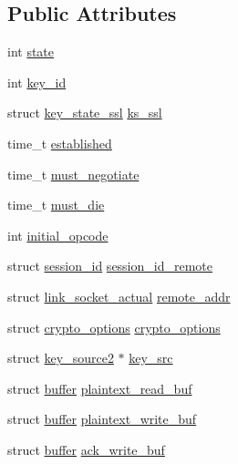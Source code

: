 \subsection*{Public Attributes}
\begin{DoxyCompactItemize}
\item 
int \hyperlink{structkey__state_a42be32cf0cb8d287f43befbbb6715472}{state}
\item 
int \hyperlink{structkey__state_ab96385bedbe98845a4b5c64adb4e9f09}{key\+\_\+id}
\item 
struct \hyperlink{structkey__state__ssl}{key\+\_\+state\+\_\+ssl} \hyperlink{structkey__state_a8fe04c96cfdb018c1e0076355b866b39}{ks\+\_\+ssl}
\item 
time\+\_\+t \hyperlink{structkey__state_a7b4fcfc00225857f9d9dbd8cf8b0a213}{established}
\item 
time\+\_\+t \hyperlink{structkey__state_a9ab42fd298323e60f3970178fb127330}{must\+\_\+negotiate}
\item 
time\+\_\+t \hyperlink{structkey__state_a4dcda328566d402e1b0413df355398d6}{must\+\_\+die}
\item 
int \hyperlink{structkey__state_af0e663142818e5e45c4fd6b434c8c431}{initial\+\_\+opcode}
\item 
struct \hyperlink{structsession__id}{session\+\_\+id} \hyperlink{structkey__state_aa2f4046c0cb3757c8cc20702dc4097ad}{session\+\_\+id\+\_\+remote}
\item 
struct \hyperlink{structlink__socket__actual}{link\+\_\+socket\+\_\+actual} \hyperlink{structkey__state_a62d42581c267f57f88b125c70fc98439}{remote\+\_\+addr}
\item 
struct \hyperlink{structcrypto__options}{crypto\+\_\+options} \hyperlink{structkey__state_a2432af1bf9969f63599688a7adf3306d}{crypto\+\_\+options}
\item 
struct \hyperlink{structkey__source2}{key\+\_\+source2} $\ast$ \hyperlink{structkey__state_af59a9aa0960261d4ed9d816b5448b732}{key\+\_\+src}
\item 
struct \hyperlink{structbuffer}{buffer} \hyperlink{structkey__state_a367442f94779a58b94e7d0f3c5d56c20}{plaintext\+\_\+read\+\_\+buf}
\item 
struct \hyperlink{structbuffer}{buffer} \hyperlink{structkey__state_a5c5ca3ca552b1cc3718d81587bdeb9c9}{plaintext\+\_\+write\+\_\+buf}
\item 
struct \hyperlink{structbuffer}{buffer} \hyperlink{structkey__state_a2fbf1804a3fd7c2d50bc7582319e2bdb}{ack\+\_\+write\+\_\+buf}
\item 

\end{DoxyCompactItemize}
